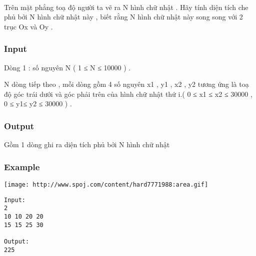 

 

Trên mặt phẳng toạ độ người ta vẽ ra N hình chữ nhật . Hãy tính diện tích che phủ bởi N hình chữ nhật này , biết rằng N hình chữ nhật này song song với 2 trục Ox và Oy .

\subsubsection{Input}

Dòng 1 : số nguyên N ( 1 ≤ N ≤ 10000 ) .


N dòng tiếp theo , mỗi dòng gồm 4 số nguyên x1 , y1 , x2 , y2 tương ứng là toạ độ góc trái dưới và góc phải trên của hình chữ nhật thứ i.( 0 ≤ x1 ≤ x2 ≤ 30000 , 0 ≤ y1≤ y2 ≤ 30000 ) .

\subsubsection{Output}

Gồm 1 dòng ghi ra diện tích phủ bởi N hình chữ nhật

\subsubsection{Example}


\texttt{[image: http://www.spoj.com/content/hard7771988:area.gif]}
\begin{verbatim}
Input:
2
10 10 20 20
15 15 25 30

Output:
225 

\end{verbatim}
